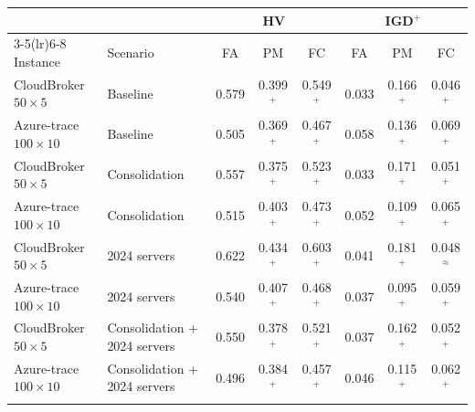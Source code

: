 \begin{tabular}{llcccccc}
\toprule
 & & \multicolumn{3}{c}{HV} & \multicolumn{3}{c}{IGD$^{+}$} \\
\cmidrule(lr){3-5}\cmidrule(lr){6-8}
Instance & Scenario & FA & PM & FC & FA & PM & FC \\
\midrule
CloudBroker $50\times5$ & Baseline & 0.579 & 0.399$^{+}$ & 0.549$^{+}$ & 0.033 & 0.166$^{+}$ & 0.046$^{+}$ \\
Azure-trace $100\times10$ & Baseline & 0.505 & 0.369$^{+}$ & 0.467$^{+}$ & 0.058 & 0.136$^{+}$ & 0.069$^{+}$ \\
CloudBroker $50\times5$ & Consolidation & 0.557 & 0.375$^{+}$ & 0.523$^{+}$ & 0.033 & 0.171$^{+}$ & 0.051$^{+}$ \\
Azure-trace $100\times10$ & Consolidation & 0.515 & 0.403$^{+}$ & 0.473$^{+}$ & 0.052 & 0.109$^{+}$ & 0.065$^{+}$ \\
CloudBroker $50\times5$ & 2024 servers & 0.622 & 0.434$^{+}$ & 0.603$^{+}$ & 0.041 & 0.181$^{+}$ & 0.048$^{\approx}$ \\
Azure-trace $100\times10$ & 2024 servers & 0.540 & 0.407$^{+}$ & 0.468$^{+}$ & 0.037 & 0.095$^{+}$ & 0.059$^{+}$ \\
CloudBroker $50\times5$ & Consolidation + 2024 servers & 0.550 & 0.378$^{+}$ & 0.521$^{+}$ & 0.037 & 0.162$^{+}$ & 0.052$^{+}$ \\
Azure-trace $100\times10$ & Consolidation + 2024 servers & 0.496 & 0.384$^{+}$ & 0.457$^{+}$ & 0.046 & 0.115$^{+}$ & 0.062$^{+}$ \\
\botrule
\end{tabular}